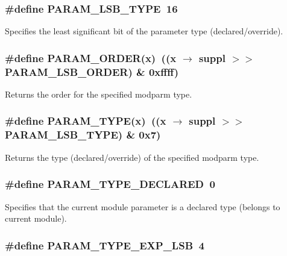 \subsubsection{\setlength{\rightskip}{0pt plus 5cm}\#define PARAM\_\-LSB\_\-TYPE\ 16}\label{group__param__suppl_a1}


Specifies the least significant bit of the parameter type (declared/override). 
\subsubsection{\setlength{\rightskip}{0pt plus 5cm}\#define PARAM\_\-ORDER(x)\ ((x $\rightarrow$ suppl $>$$>$ PARAM\_\-LSB\_\-ORDER) \& 0xffff)}\label{group__param__suppl_a8}


Returns the order for the specified modparm type. 
\subsubsection{\setlength{\rightskip}{0pt plus 5cm}\#define PARAM\_\-TYPE(x)\ ((x $\rightarrow$ suppl $>$$>$ PARAM\_\-LSB\_\-TYPE) \& 0x7)}\label{group__param__suppl_a9}


Returns the type (declared/override) of the specified modparm type. 
\subsubsection{\setlength{\rightskip}{0pt plus 5cm}\#define PARAM\_\-TYPE\_\-DECLARED\ 0}\label{group__param__suppl_a2}


Specifies that the current module parameter is a declared type (belongs to current module). 
\subsubsection{\setlength{\rightskip}{0pt plus 5cm}\#define PARAM\_\-TYPE\_\-EXP\_\-LSB\ 4}\label{group__param__suppl_a6}


